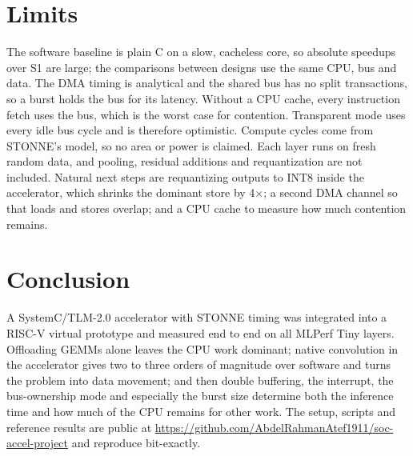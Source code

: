 \documentclass[conference]{IEEEtran}
\begin{document}
\section{Limits}
The software baseline is plain C on a slow, cacheless core, so absolute speedups over S1 are large; the comparisons between designs use the same CPU, bus and data. The DMA timing is analytical and the shared bus has no split transactions, so a burst holds the bus for its latency. Without a CPU cache, every instruction fetch uses the bus, which is the worst case for contention. Transparent mode uses every idle bus cycle and is therefore optimistic. Compute cycles come from STONNE's model, so no area or power is claimed. Each layer runs on fresh random data, and pooling, residual additions and requantization are not included. Natural next steps are requantizing outputs to INT8 inside the accelerator, which shrinks the dominant store by 4$\times$; a second DMA channel so that loads and stores overlap; and a CPU cache to measure how much contention remains.

\section{Conclusion}
A SystemC/TLM-2.0 accelerator with STONNE timing was integrated into a RISC-V virtual prototype and measured end to end on all MLPerf Tiny layers. Offloading GEMMs alone leaves the CPU work dominant; native convolution in the accelerator gives two to three orders of magnitude over software and turns the problem into data movement; and then double buffering, the interrupt, the bus-ownership mode and especially the burst size determine both the inference time and how much of the CPU remains for other work. The setup, scripts and reference results are public at \url{https://github.com/AbdelRahmanAtef1911/soc-accel-project} and reproduce bit-exactly.



\end{document}
